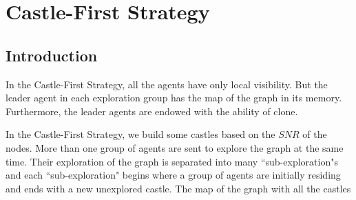

               
\section{Castle-First Strategy}
\subsection{ Introduction}
In the Castle-First Strategy, all the agents have only   local visibility. But the leader agent in each exploration group has the map of the graph in its memory. Furthermore, the leader agents are endowed with the ability of clone.

In the Castle-First Strategy, we build some castles based on the  $SNR$ of the nodes. More than one group of agents are sent to explore the graph at the same time. Their exploration of the graph is separated into many ``sub-exploration"s and each ``sub-exploration" begins   where a group of  agents are  initially residing  and ends with a new unexplored castle. The map of the graph with all the castles %

